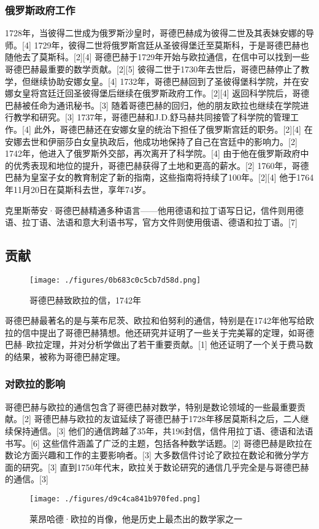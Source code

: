 \subsubsection{俄罗斯政府工作} 
1728年，当彼得二世成为俄罗斯沙皇时，哥德巴赫成为彼得二世及其表妹安娜的导师。[4] 1729年，彼得二世将俄罗斯宫廷从圣彼得堡迁至莫斯科，于是哥德巴赫也随他去了莫斯科。[2][4] 哥德巴赫于1729年开始与欧拉通信，在信中可以找到一些哥德巴赫最重要的数学贡献。[2][5] 彼得二世于1730年去世后，哥德巴赫停止了教学，但继续协助安娜女皇。[4] 1732年，哥德巴赫回到了圣彼得堡科学院，并在安娜女皇将宫廷迁回圣彼得堡后继续在俄罗斯政府工作。[2][4] 返回科学院后，哥德巴赫被任命为通讯秘书。[3] 随着哥德巴赫的回归，他的朋友欧拉也继续在学院进行教学和研究。[3] 1737年，哥德巴赫和J.D.舒马赫共同接管了科学院的管理工作。[4] 此外，哥德巴赫还在安娜女皇的统治下担任了俄罗斯宫廷的职务。[2][4] 在安娜去世和伊丽莎白女皇执政后，他成功地保持了自己在宫廷中的影响力。[2] 1742年，他进入了俄罗斯外交部，再次离开了科学院。[4] 由于他在俄罗斯政府中的优秀表现和地位的提升，哥德巴赫获得了土地和更高的薪水。[2] 1760年，哥德巴赫为皇室子女的教育制定了新的指南，这些指南将持续了100年。[2][4] 他于1764年11月20日在莫斯科去世，享年74岁。

克里斯蒂安·哥德巴赫精通多种语言——他用德语和拉丁语写日记，信件则用德语、拉丁语、法语和意大利语书写，官方文件则使用俄语、德语和拉丁语。[7]
\subsection{贡献}
\begin{figure}[ht]
\centering
\texttt{[image: ./figures/0b683c0c5cb7d58d.png]}
\caption{哥德巴赫致欧拉的信，1742年} \label{fig_Goldba_2}
\end{figure}
哥德巴赫最著名的是与莱布尼茨、欧拉和伯努利的通信，特别是在1742年他写给欧拉的信中提出了哥德巴赫猜想。他还研究并证明了一些关于完美幂的定理，如哥德巴赫–欧拉定理，并对分析学做出了若干重要贡献。[1] 他还证明了一个关于费马数的结果，被称为哥德巴赫定理。
\subsubsection{对欧拉的影响} 
哥德巴赫与欧拉的通信包含了哥德巴赫对数学，特别是数论领域的一些最重要贡献。[2] 哥德巴赫与欧拉的友谊延续了哥德巴赫于1728年移居莫斯科之后，二人继续保持通信。[3] 他们的通信跨越了35年，共196封信，信件用拉丁语、德语和法语书写。[6] 这些信件涵盖了广泛的主题，包括各种数学话题。[2] 哥德巴赫是欧拉在数论方面兴趣和工作的主要影响者。[3] 大多数信件讨论了欧拉在数论和微分学方面的研究。[3] 直到1750年代末，欧拉关于数论研究的通信几乎完全是与哥德巴赫的通信。[3]
\begin{figure}[ht]
\centering
\texttt{[image: ./figures/d9c4ca841b970fed.png]}
\caption{莱昂哈德·欧拉的肖像，他是历史上最杰出的数学家之一} \label{fig_Goldba_3}
\end{figure}